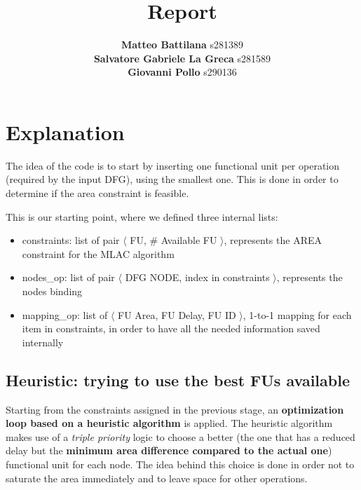 \documentclass{article}
\title{\Huge Report}
\author{
	\large \textbf{Matteo Battilana} s281389 \\
	\large \textbf{Salvatore Gabriele La Greca} s281589 \\
	\large \textbf{Giovanni Pollo} s290136}
\date{}
\begin{document}
	\begin{titlepage}
		\centering
		\vspace{2px}
	\end{titlepage}
	\maketitle
	\thispagestyle{empty}
	
	\newpage
	
	\thispagestyle{empty}
	
	\section{Explanation}
	
	The idea of the code is to start by inserting one functional unit per operation (required by the input DFG), using the smallest one. This is done in order to determine if the area constraint is feasible.
	
	This is our starting point, where we defined three internal lists:
	
	\begin{itemize}
		\itemsep0sp
		\item constraints: list of pair $\langle$ FU, \# Available FU $\rangle$, represents the AREA constraint for the MLAC algorithm
		\item nodes\_op: list of pair $\langle$ DFG NODE, index in constraints $\rangle$, represents the nodes binding
		\item mapping\_op: list of $\langle$ FU Area, FU Delay, FU ID $\rangle$, 1-to-1 mapping for each item in constraints, in order to have all the needed information saved internally
	\end{itemize}
	
	\subsection{Heuristic: trying to use the best FUs available}
	
	Starting from the constraints assigned in the previous stage, an \textbf{optimization loop based on a heuristic algorithm} is applied. The heuristic algorithm makes use of a \textit{triple priority} logic to choose a better (the one that has a reduced delay but the \textbf{minimum area difference compared to the actual one}) functional unit for each node. The idea behind this choice is done in order not to saturate the area immediately and to leave space for other operations.
	
\end{document}
